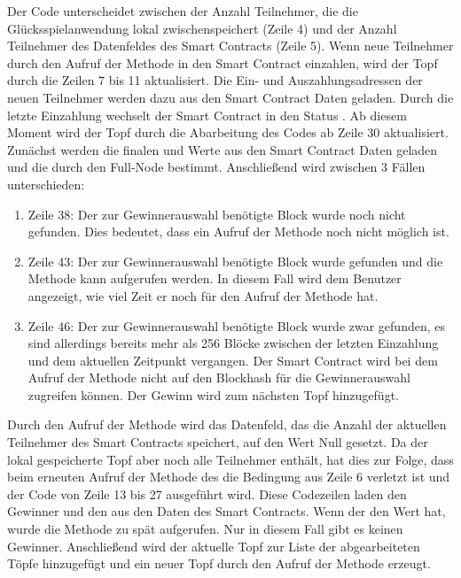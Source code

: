 Der Code unterscheidet zwischen der Anzahl Teilnehmer, die die Glücks\-spiel\-anwendung lokal zwischenspeichert (Zeile 4) und der Anzahl Teilnehmer des Datenfeldes des Smart Contracts (Zeile 5). Wenn neue Teilnehmer durch den Aufruf der  Methode in den Smart Contract einzahlen, wird der Topf durch die Zeilen 7 bis 11 aktualisiert. Die Ein- und Auszahlungsadressen der neuen Teilnehmer werden dazu aus den Smart Contract Daten geladen.
Durch die letzte Einzahlung wechselt der Smart Contract in den Status . Ab diesem Moment wird der Topf durch die Abarbeitung des Codes ab Zeile 30 aktualisiert. Zunächst werden die finalen  und  Werte aus den Smart Contract Daten geladen und die  durch den Full-Node bestimmt. Anschließend wird zwischen 3 Fällen unterschieden:
\begin{enumerate}
\item Zeile 38: Der zur Gewinnerauswahl benötigte Block wurde noch nicht gefunden. Dies bedeutet, dass ein Aufruf der  Methode noch nicht möglich ist.
\item Zeile 43: Der zur Gewinnerauswahl benötigte Block wurde gefunden und die  Methode kann aufgerufen werden. In diesem Fall wird dem Benutzer angezeigt, wie viel Zeit er noch für den Aufruf der  Methode hat. 
\item Zeile 46: Der zur Gewinnerauswahl benötigte Block wurde zwar gefunden, es sind allerdings bereits mehr als 256 Blöcke zwischen der letzten Einzahlung und dem aktuellen Zeitpunkt vergangen. Der Smart Contract wird bei dem Aufruf der  Methode nicht auf den Blockhash für die Gewinnerauswahl zugreifen können. Der Gewinn wird zum nächsten Topf hinzugefügt.
\end{enumerate}
Durch den Aufruf der  Methode wird das Datenfeld, das die Anzahl der aktuellen Teilnehmer des Smart Contracts speichert, auf den Wert Null gesetzt. Da der lokal gespeicherte Topf aber noch alle Teilnehmer enthält, hat dies zur Folge, dass beim erneuten Aufruf der  Methode des  die Bedingung aus Zeile 6 verletzt ist und der Code von Zeile 13 bis 27 ausgeführt wird. Diese Codezeilen laden den Gewinner und den  aus den Daten des Smart Contracts. Wenn der  den Wert  hat, wurde die  Methode zu spät aufgerufen. Nur in diesem Fall gibt es keinen Gewinner. Anschließend wird der aktuelle Topf zur Liste der abgearbeiteten Töpfe hinzugefügt und ein neuer Topf durch den Aufruf der  Methode erzeugt.
\newpage

